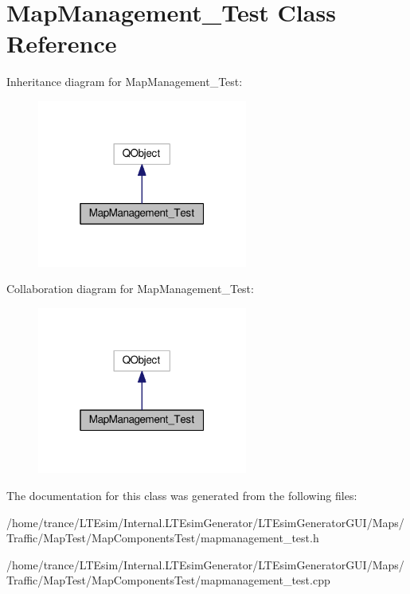 \hypertarget{class_map_management___test}{}\section{Map\+Management\+\_\+\+Test Class Reference}
\label{class_map_management___test}


Inheritance diagram for Map\+Management\+\_\+\+Test\+:
\nopagebreak
\begin{figure}[H]
\begin{center}
\leavevmode
\includegraphics[width=196pt]{class_map_management___test__inherit__graph}
\end{center}
\end{figure}


Collaboration diagram for Map\+Management\+\_\+\+Test\+:
\nopagebreak
\begin{figure}[H]
\begin{center}
\leavevmode
\includegraphics[width=196pt]{class_map_management___test__coll__graph}
\end{center}
\end{figure}


The documentation for this class was generated from the following files\+:\begin{DoxyCompactItemize}
\item 
/home/trance/\+L\+T\+Esim/\+Internal.\+L\+T\+Esim\+Generator/\+L\+T\+Esim\+Generator\+G\+U\+I/\+Maps/\+Traffic/\+Map\+Test/\+Map\+Components\+Test/mapmanagement\+\_\+test.\+h\item 
/home/trance/\+L\+T\+Esim/\+Internal.\+L\+T\+Esim\+Generator/\+L\+T\+Esim\+Generator\+G\+U\+I/\+Maps/\+Traffic/\+Map\+Test/\+Map\+Components\+Test/mapmanagement\+\_\+test.\+cpp\end{DoxyCompactItemize}
